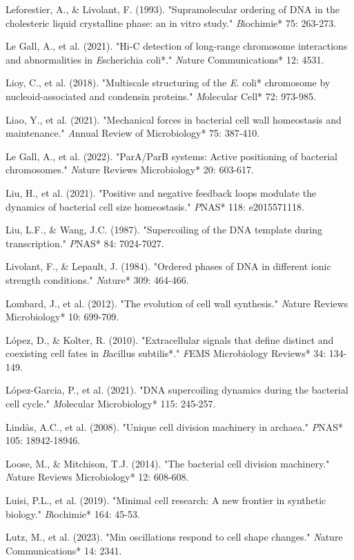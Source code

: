 \documentclass[11pt,a4paper]{article}
\begin{document}
Leforestier, A., & Livolant, F. (1993). "Supramolecular ordering of DNA in the cholesteric liquid crystalline phase: an in vitro study." \textit*Biochimie* 75: 263-273.

Le Gall, A., et al. (2021). "Hi-C detection of long-range chromosome interactions and abnormalities in \textit*Escherichia coli*." \textit*Nature Communications* 12: 4531.

Lioy, C., et al. (2018). "Multiscale structuring of the \textit*E. coli* chromosome by nucleoid-associated and condensin proteins." \textit*Molecular Cell* 72: 973-985.

Liao, Y., et al. (2021). "Mechanical forces in bacterial cell wall homeostasis and maintenance." \textit*Annual Review of Microbiology* 75: 387-410.

Le Gall, A., et al. (2022). "ParA/ParB systems: Active positioning of bacterial chromosomes." \textit*Nature Reviews Microbiology* 20: 603-617.

Liu, H., et al. (2021). "Positive and negative feedback loops modulate the dynamics of bacterial cell size homeostasis." \textit*PNAS* 118: e2015571118.

Liu, L.F., & Wang, J.C. (1987). "Supercoiling of the DNA template during transcription." \textit*PNAS* 84: 7024-7027.

Livolant, F., & Lepault, J. (1984). "Ordered phases of DNA in different ionic strength conditions." \textit*Nature* 309: 464-466.

Lombard, J., et al. (2012). "The evolution of cell wall synthesis." \textit*Nature Reviews Microbiology* 10: 699-709.

López, D., & Kolter, R. (2010). "Extracellular signals that define distinct and coexisting cell fates in \textit*Bacillus subtilis*." \textit*FEMS Microbiology Reviews* 34: 134-149.

López-Garcia, P., et al. (2021). "DNA supercoiling dynamics during the bacterial cell cycle." \textit*Molecular Microbiology* 115: 245-257.

Lindås, A.C., et al. (2008). "Unique cell division machinery in archaea." \textit*PNAS* 105: 18942-18946.

Loose, M., & Mitchison, T.J. (2014). "The bacterial cell division machinery." \textit*Nature Reviews Microbiology* 12: 608-608.

Luisi, P.L., et al. (2019). "Minimal cell research: A new frontier in synthetic biology." \textit*Biochimie* 164: 45-53.

Lutz, M., et al. (2023). "Min oscillations respond to cell shape changes." \textit*Nature Communications* 14: 2341.
\end{document}
